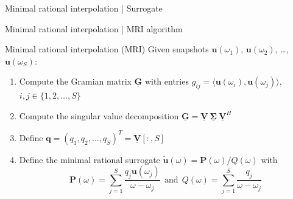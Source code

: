 \documentclass{beamer}
\begin{document}
\begin{frame}{Minimal rational interpolation | Surrogate}

    \vspace{20pt}

\end{frame}

\begin{frame}{Minimal rational interpolation | MRI algorithm}

    \begin{block}{Minimal rational interpolation (MRI) \cite{greedyMRI}}
        Given snapshots $\mathbf{u}(\omega_1)$, $\mathbf{u}(\omega_2)$, \dots, $\mathbf{u}(\omega_S)$:
        \begin{enumerate}
            \item<2-> Compute the Gramian matrix $\mathbf{\underline{G}}$ with entries $g_{ij} = \langle \mathbf{u}(\omega_i), \mathbf{u}(\omega_j) \rangle$, $i,j \in \{1, 2, \dots, S\}$
            \item<3-> Compute the singular value decomposition $\mathbf{\underline{G}} = \mathbf{\underline{V}}~\boldsymbol{\underline{\Sigma}}~\mathbf{\underline{V}}^H$
            \item<4-> Define $\mathbf{q} = (q_1, q_2, \dots, q_S)^T = \mathbf{\underline{V}}[:, S]$
            \item<5-> Define the minimal rational surrogate $\mathbf{\tilde{u}}(\omega) = \mathbf{P}(\omega) / Q(\omega)$ with 
            \begin{equation*}
                \mathbf{P}(\omega) = \sum_{j=1}^S \frac{q_j \mathbf{u}(\omega_j)}{\omega - \omega_j}~~\text{and}~~Q(\omega) = \sum_{j=1}^S \frac{q_j}{\omega - \omega_j}
            \end{equation*}
        \end{enumerate}
    \end{block}

\end{frame}
\end{document}
